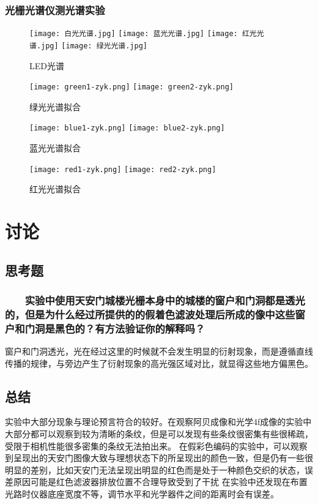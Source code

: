 \documentclass[12pt,a4paper]{article}
\begin{document}
        \subsubsection{光栅光谱仪测光谱实验}
            \begin{figure}[H]
                \centering
                \texttt{[image: 白光光谱.jpg]}
                \texttt{[image: 蓝光光谱.jpg]}
                \texttt{[image: 红光光谱.jpg]}
                \texttt{[image: 绿光光谱.jpg]}
                \caption{LED光谱}
            \end{figure}
        \begin{figure}[H]
            \centering
            \texttt{[image: green1-zyk.png]}
            \texttt{[image: green2-zyk.png]}
            \caption{绿光光谱拟合}
        \end{figure}
        \begin{figure}[H]
            \centering
            \texttt{[image: blue1-zyk.png]}
            \texttt{[image: blue2-zyk.png]}
            \caption{蓝光光谱拟合}
        \end{figure}
        \begin{figure}[H]
            \centering
            \texttt{[image: red1-zyk.png]}
            \texttt{[image: red2-zyk.png]}
            \caption{红光光谱拟合}
        \end{figure}

\section{讨论}
    \subsection{思考题}
        \subsubsection*{$\qquad$实验中使用天安门城楼光栅本身中的城楼的窗户和门洞都是透光的，但是为什么经过所提供的的假着色滤波处理后所成的像中这些窗户和门洞是黑色的？有方法验证你的解释吗？}
        窗户和门洞透光，光在经过这里的时候就不会发生明显的衍射现象，而是遵循直线传播的规律，与旁边产生了衍射现象的高光强区域对比，就显得这些地方偏黑色。
    \subsection{总结}
        实验中大部分现象与理论预言符合的较好。在观察阿贝成像和光学4f成像的实验中大部分都可以观察到较为清晰的条纹，但是可以发现有些条纹很密集有些很稀疏，受限于相机性能很多密集的条纹无法拍出来。
        在假彩色编码的实验中，可以观察到呈现出的天安门图像大致与理想状态下的所呈现出的颜色一致，但是仍有一些很明显的差别，比如天安门无法呈现出明显的红色而是处于一种颜色交织的状态，误差原因可能是红色滤波器排放位置不合理导致受到了干扰
        在实验中还发现在布置光路时仪器底座宽度不等，调节水平和光学器件之间的距离时会有误差。
\end{document}
